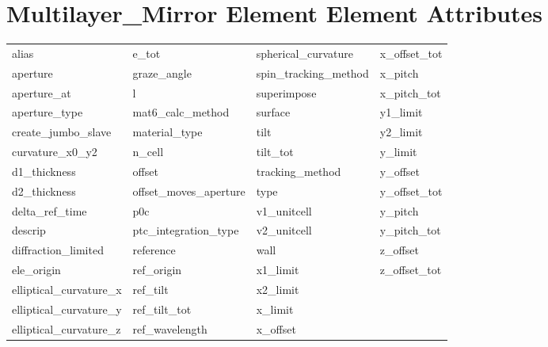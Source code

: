  \section{Multilayer_Mirror Element Element Attributes}
 \label{s:list.multilayer.mirror}
 
 \begin{tabular}{llll} \toprule
alias                       & e_tot                       & spherical_curvature         & x_offset_tot                \\
aperture                    & graze_angle                 & spin_tracking_method        & x_pitch                     \\
aperture_at                 & l                           & superimpose                 & x_pitch_tot                 \\
aperture_type               & mat6_calc_method            & surface                     & y1_limit                    \\
create_jumbo_slave          & material_type               & tilt                        & y2_limit                    \\
curvature_x0_y2             & n_cell                      & tilt_tot                    & y_limit                     \\
d1_thickness                & offset                      & tracking_method             & y_offset                    \\
d2_thickness                & offset_moves_aperture       & type                        & y_offset_tot                \\
delta_ref_time              & p0c                         & v1_unitcell                 & y_pitch                     \\
descrip                     & ptc_integration_type        & v2_unitcell                 & y_pitch_tot                 \\
diffraction_limited         & reference                   & wall                        & z_offset                    \\
ele_origin                  & ref_origin                  & x1_limit                    & z_offset_tot                \\
elliptical_curvature_x      & ref_tilt                    & x2_limit                    &                             \\
elliptical_curvature_y      & ref_tilt_tot                & x_limit                     &                             \\
elliptical_curvature_z      & ref_wavelength              & x_offset                    &                             \\
 \bottomrule
 \end{tabular}
 \vfill
 
